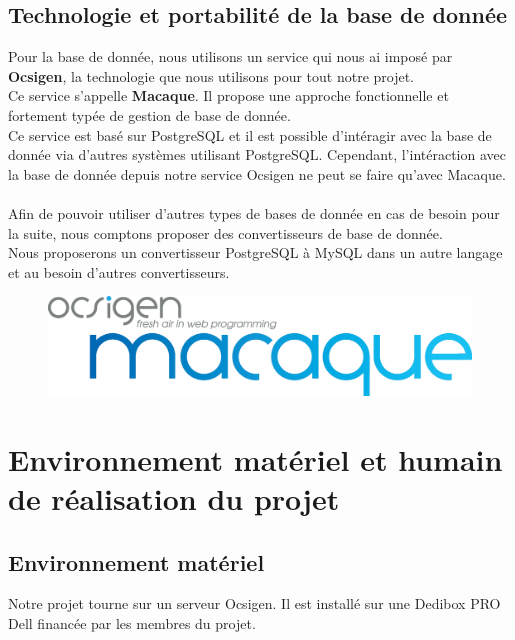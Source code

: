 \documentclass{life-fr}
\begin{document}
\section{Technologie et portabilité de la base de donnée}

Pour la base de donnée, nous utilisons un service qui nous ai imposé par
\textbf{Ocsigen}, la technologie que nous utilisons pour tout notre projet.\\
Ce service s'appelle \textbf{Macaque}. Il propose une approche fonctionnelle
et fortement typée de gestion de base de donnée.\\
Ce service est basé sur PostgreSQL et il est possible d'intéragir avec la
base de donnée via d'autres systèmes utilisant PostgreSQL.
Cependant, l'intéraction avec la base de donnée depuis notre service Ocsigen
ne peut se faire qu'avec Macaque.\\
\\
Afin de pouvoir utiliser d'autres types de bases de donnée en cas de besoin
pour la suite, nous comptons proposer des convertisseurs de base de donnée.\\
Nous proposerons un convertisseur PostgreSQL à MySQL dans un autre langage et
au besoin d'autres convertisseurs.

\begin{figure}[H]
  \begin{center}
    \includegraphics[width=13cm]{img/macaque.png}
  \end{center}
\end{figure}


\chapter{Environnement matériel et humain de réalisation du projet}

\section{Environnement matériel}

Notre projet tourne sur un serveur Ocsigen. Il est installé sur une Dedibox PRO Dell financée par les membres du projet.
\end{document}
